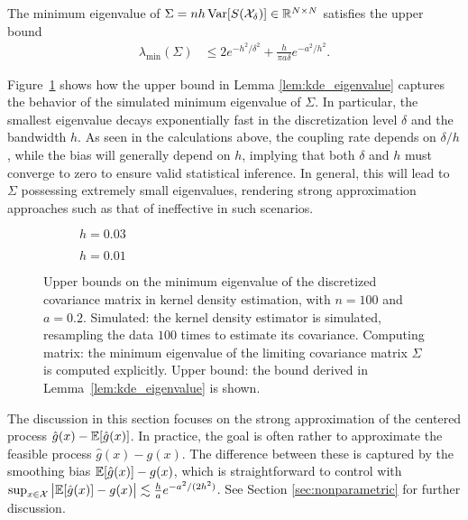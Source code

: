 \begin{lemma}%
  \label{lem:kde_eigenvalue}
  The minimum eigenvalue of
  $\Sigma=n h\operatorname{Var}[S(\mathcal{X}_\delta)] \in \mathbb{R}^{N \times N}$
  satisfies the upper bound
  \begin{align*}
    \lambda_{\min}(\Sigma)
    &\leq
    2 e^{-h^2/\delta^2}
    + \frac{h}{\pi a \delta}
    e^{-a^2 / h^2}.
  \end{align*}
\end{lemma}
%
Figure~\ref{fig:min_eig} shows how the upper bound in Lemma
\ref{lem:kde_eigenvalue} captures the behavior of the simulated minimum
eigenvalue of $\Sigma$. In particular, the smallest eigenvalue decays
exponentially fast in the discretization level $\delta$ and the bandwidth $h$.
As seen in the calculations above, the coupling rate depends on $\delta / h$,
while the bias will generally depend on $h$, implying that both $\delta$ and
$h$ must converge to zero to ensure valid statistical inference. In general,
this will lead to $\Sigma$ possessing extremely small eigenvalues, rendering
strong approximation approaches such as that of \citet{li2020uniform}
ineffective in such scenarios.
%
\begin{figure}[ht]
  \centering
  \begin{subfigure}{0.45\textwidth}
    \centering
    \caption{$h = 0.03$}
  \end{subfigure}
  \begin{subfigure}{0.45\textwidth}
    \centering
    \caption{$h = 0.01$}
  \end{subfigure}
  \caption{
    Upper bounds on the minimum eigenvalue of the discretized covariance
    matrix in kernel density estimation,
    with $n=100$ and $a = 0.2$.
    Simulated: the kernel density estimator is simulated,
    resampling the data $100$ times
    to estimate its covariance.
    Computing matrix: the minimum eigenvalue of the limiting covariance
    matrix $\Sigma$ is computed explicitly.
    Upper bound: the bound derived in
    Lemma~\ref{lem:kde_eigenvalue}
    is shown.
  }
  \label{fig:min_eig}
\end{figure}

The discussion in this section focuses on the strong approximation of the
centered process $\hat g(x)-\mathbb{E} [ \hat g(x) ]$. In practice, the goal is often
rather to approximate the feasible process $\hat g(x)- g(x)$. The difference
between these is captured by the smoothing bias $\mathbb{E} [ \hat g(x) ] - g(x)$,
which is straightforward to control with
$\sup_{x \in \mathcal{X}} \big| \mathbb{E} [ \hat g(x) ] - g(x) \big|
\lesssim \frac{h}{a} e^{-a^2 / (2 h^2)}$.
See Section \ref{sec:nonparametric} for further
discussion.

